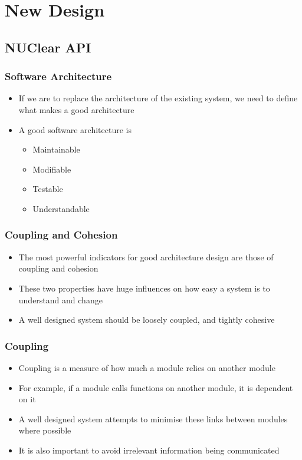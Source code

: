 \documentclass{beamer}
\begin{document}
\section{New Design}
\begin{frame}
	\sectionpage
\end{frame}

\subsection{NUClear API}
\begin{frame}
	\frametitle{Software Architecture}
	\begin{itemize}
		\item If we are to replace the architecture of the existing system, we need to define what makes a good architecture
		\item A good software architecture is
		\begin{itemize}
			\item Maintainable
			\item Modifiable
			\item Testable
			\item Understandable
		\end{itemize}
	\end{itemize}
\end{frame}

\begin{frame}
	\frametitle{Coupling and Cohesion}
	\begin{itemize}
		\item The most powerful indicators for good architecture design are those of coupling and cohesion
		\item These two properties have huge influences on how easy a system is to understand and change
		\item A well designed system should be loosely coupled, and tightly cohesive
	\end{itemize}
\end{frame}

\begin{frame}
	\frametitle{Coupling}
	\begin{itemize}
		\item Coupling is a measure of how much a module relies on another module
		\item For example, if a module calls functions on another module, it is dependent on it
		\item A well designed system attempts to minimise these links between modules where possible
		\item It is also important to avoid irrelevant information being communicated
	\end{itemize}
\end{frame}
\end{document}
